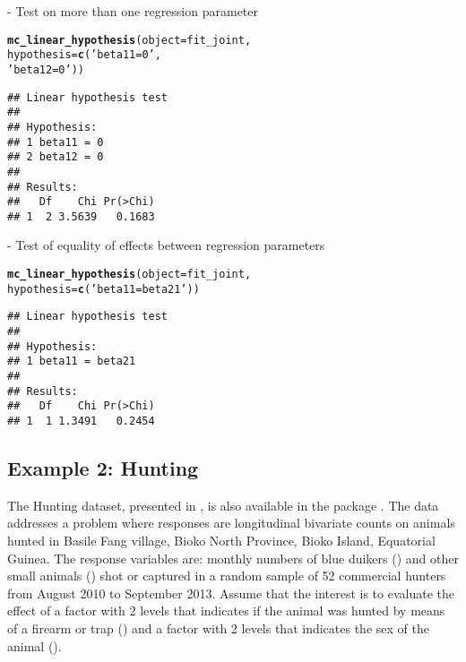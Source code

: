 \documentclass[article]{jss}\usepackage[]{graphicx}\usepackage[]{xcolor}
\makeatletter
\newcommand{\hlstr}[1]{\textcolor[rgb]{0.192,0.494,0.8}{#1}}%
\newcommand{\hlstd}[1]{\textcolor[rgb]{0.345,0.345,0.345}{#1}}%
\newcommand{\hlkwc}[1]{\textcolor[rgb]{0.333,0.667,0.333}{#1}}%
\newcommand{\hlkwd}[1]{\textcolor[rgb]{0.737,0.353,0.396}{\textbf{#1}}}%
\newenvironment{kframe}{%
 \def\at@end@of@kframe{}%
 \ifinner\ifhmode%
  \def\at@end@of@kframe{\end{minipage}}%
  \begin{minipage}{\columnwidth}%
 \fi\fi%
 \def\FrameCommand##1{\hskip\@totalleftmargin \hskip-\fboxsep
 \colorbox{shadecolor}{##1}\hskip-\fboxsep
     \hskip-\linewidth \hskip-\@totalleftmargin \hskip\columnwidth}%
 \MakeFramed {\advance\hsize-\width
   \@totalleftmargin\z@ \linewidth\hsize
   \@setminipage}}%
 {\par\unskip\endMakeFramed%
 \at@end@of@kframe}
\newenvironment{knitrout}{}{} %
\makeatother
\begin{document}
 - Test on more than one regression parameter

\begin{knitrout}
\color{fgcolor}\begin{kframe}
\begin{alltt}
\hlkwd{mc_linear_hypothesis}\hlstd{(}\hlkwc{object} \hlstd{=  fit_joint,}
                     \hlkwc{hypothesis} \hlstd{=} \hlkwd{c}\hlstd{(}\hlstr{'beta11 = 0'}\hlstd{,}
                                    \hlstr{'beta12 = 0'}\hlstd{))}
\end{alltt}
\begin{verbatim}
## Linear hypothesis test
## 
## Hypothesis:            
## 1 beta11 = 0
## 2 beta12 = 0
## 
## Results:
##   Df    Chi Pr(>Chi)
## 1  2 3.5639   0.1683
\end{verbatim}
\end{kframe}
\end{knitrout}

 - Test of equality of effects between regression parameters

\begin{knitrout}
\color{fgcolor}\begin{kframe}
\begin{alltt}
\hlkwd{mc_linear_hypothesis}\hlstd{(}\hlkwc{object} \hlstd{=  fit_joint,}
                     \hlkwc{hypothesis} \hlstd{=} \hlkwd{c}\hlstd{(}\hlstr{'beta11 = beta21'}\hlstd{))}
\end{alltt}
\begin{verbatim}
## Linear hypothesis test
## 
## Hypothesis:                 
## 1 beta11 = beta21
## 
## Results:
##   Df    Chi Pr(>Chi)
## 1  1 1.3491   0.2454
\end{verbatim}
\end{kframe}
\end{knitrout}


\subsection{Example 2: Hunting}

The Hunting dataset, presented in \citet{hunting}, is also available in the package . The data addresses a problem where responses are longitudinal bivariate counts on animals hunted in Basile Fang village, Bioko North Province, Bioko Island, Equatorial Guinea. The response variables are: monthly numbers of blue duikers () and other small animals () shot or captured in a random sample of 52 commercial hunters from August 2010 to September 2013. Assume that the interest is to evaluate the effect of a factor with 2 levels that indicates if the animal was hunted by means of a firearm or trap () and a factor with 2 levels that indicates the sex of the animal ().
\end{document}
